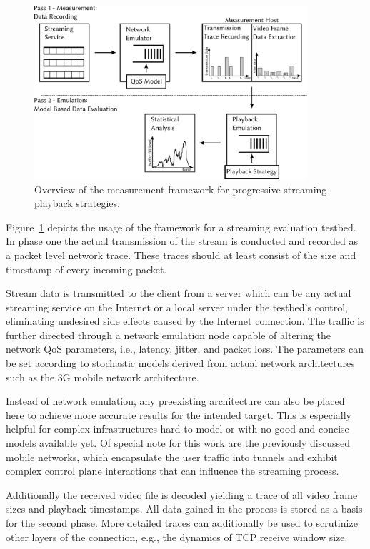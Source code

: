 \begin{figure}[htb]
	\centering
	\includegraphics[width=0.9\textwidth]{images/measurement-model.pdf}
	\caption{Overview of the measurement framework for progressive streaming playback strategies.}
\label{c3:fig:framework}
\end{figure}

Figure~\ref{c3:fig:framework} depicts the usage of the framework for a streaming evaluation testbed. In phase one the actual transmission of the stream is conducted and recorded as a packet level network trace. These traces should at least consist of the size and timestamp of every incoming packet.

Stream data is transmitted to the client from a server which can be any actual streaming service on the Internet or a local server under the testbed's control, eliminating undesired side effects caused by the Internet connection. The traffic is further directed through a network emulation node capable of altering the network \gls{QoS} parameters, i.e., latency, jitter, and packet loss. The parameters can be set according to stochastic models derived from actual network architectures such as the \gls{3G} mobile network architecture.

Instead of network emulation, any preexisting architecture can also be placed here to achieve more accurate results for the intended target. This is especially helpful for complex infrastructures hard to model or with no good and concise models available yet. Of special note for this work are the previously discussed mobile networks, which encapsulate the user traffic into tunnels and exhibit complex control plane interactions that can influence the streaming process.

Additionally the received video file is decoded yielding a trace of all video frame sizes and playback timestamps. All data gained in the process is stored as a basis for the second phase. More detailed traces can additionally be used to scrutinize other layers of the connection, e.g., the dynamics of \gls{TCP} receive window size. 


